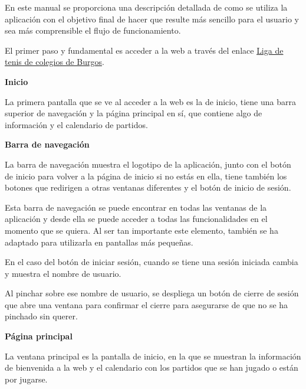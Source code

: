 En este manual se proporciona una descripción detallada de como se utiliza la aplicación con el objetivo final de hacer que resulte más sencillo para el usuario y sea más comprensible el flujo de funcionamiento.

El primer paso y fundamental es acceder a la web a través del enlace \href{http://ligatenisburgos.es/}{Liga de tenis de colegios de Burgos}.

\textbf{Inicio}

La primera pantalla que se ve al acceder a la web es la de inicio, tiene una barra superior de navegación y la página principal en sí, que contiene algo de información y el calendario de partidos.


\textbf{Barra de navegación}

La barra de navegación muestra el logotipo de la aplicación, junto con el botón de inicio para volver a la página de inicio si no estás en ella, tiene también los botones que redirigen a otras ventanas diferentes y el botón de inicio de sesión.


Esta barra de navegación se puede encontrar en todas las ventanas de la aplicación y desde ella se puede acceder a todas las funcionalidades en el momento que se quiera. Al ser tan importante este elemento, también se ha adaptado para utilizarla en pantallas más pequeñas.



En el caso del botón de iniciar sesión, cuando se tiene una sesión iniciada cambia y muestra el nombre de usuario.


Al pinchar sobre ese nombre de usuario, se despliega un botón de cierre de sesión que abre una ventana para confirmar el cierre para asegurarse de que no se ha pinchado sin querer.



\textbf{Página principal}

La ventana principal es la pantalla de inicio, en la que se muestran la información de bienvenida a la web y el calendario con los partidos que se han jugado o están por jugarse.

